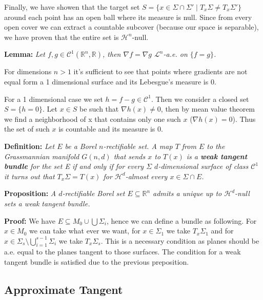\documentclass{article}
\begin{document}
\vspace{1ex}
Finally, we have showen that the target set $S=\{x\in\Sigma\cap\Sigma'\;|\;T_x\Sigma
\neq T_x\Sigma'\}$ around each point has an open ball where its measure is null.
Since from every open cover we can extract a countable subcover (because our
space is separable), we have proven that the entire set is $\mathcal H^n$-null.

\vspace{2ex}
\textbf{Lemma:} \textit{Let $f,g\in\mathcal C^1(\mathbb R^n, \mathbb R)$, then $\nabla f
=\nabla g$ $\mathcal L^n$-a.e. on $\{f=g\}$.}

\vspace{1ex}
For dimensions $n>1$ it's sufficient to see that points where gradients are not
equal form a 1 dimensional surface and its Lebesgue's measure is 0. 

For a 1 dimensional case we set $h=f-g\in\mathcal C^1$. Then we consider a
closed set $S=\{h=0\}$. Let $x\in S$ be such that $\nabla h(x)\neq 0$, then
by mean value theorem we find a neighborhood of x that contains only one such
$x$ ($\nabla h(x)=0$). Thus the set of such $x$ is countable and its measure is
0.

\vspace{2ex}
\textbf{Definition:} \textit{Let $E$ be a Borel $n$-rectifiable set. A map $T$
from $E$ to the Grassmannian manifold $G(n, d)$ that sends $x$ to $T(x)$ is a
\textbf{weak tangent bundle} for the set E if and only if for every $\Sigma$ $d$-dimensional
surface of class $\mathcal C^1$ it turns out that $T_x\Sigma = T(x)$ for $\mathcal
H^d$-almost every $x\in\Sigma\cap E$.}

\vspace{2ex}
\textbf{Proposition:} \textit{A $d$-rectifiable Borel set $E\subseteq\mathbb R^n$
admits a unique up to $\mathcal H^d$-null sets a weak tangent bundle.}

\vspace{1ex}
\textbf{Proof:} We have $E\subseteq M_0\cup\bigcup\Sigma_i$, hence we can define
a bundle as following. For $x\in M_0$ we can take what ever we want, for $x\in
\Sigma_1$ we take $T_x\Sigma_1$ and for $x\in \Sigma_s\setminus\bigcup_{i=1}^{s
-1}\Sigma_i$ we take $T_x\Sigma_s$. This is a necessary condition as planes
should be a.e. equal to the planes tangent to those surfaces. The condition for
a weak tangent bundle is satisfied due to the previous preposition.

\subsection{Approximate Tangent}
\end{document}
